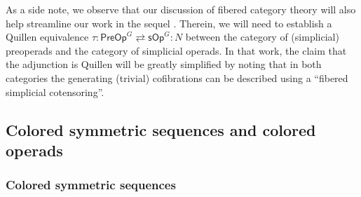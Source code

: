 \documentclass[a4paper,10pt
,draft
]{article}%
\numberwithin{equation}{section}
\numberwithin{figure}{section}
\theoremstyle{definition} %
\newcommand{\1}{\ensuremath{\mathbbm 1}}%
\begin{document}
As a side note, we observe that our discussion of fibered category theory will
also help streamline our work in the sequel \cite{BP_TAS}.
Therein, we will need to establish a Quillen equivalence
$\tau \colon \mathsf{PreOp}^G \rightleftarrows \mathsf{sOp}^G\colon N$
between the category of (simplicial) preoperads and
the category of simplicial operads.
In that work, the claim that the adjunction is Quillen 
will be greatly simplified by noting that in both categories 
the generating (trivial) cofibrations
can be described using a ``fibered simplicial cotensoring''.






\subsection{Colored symmetric sequences and colored operads}
\label{EQCOSYMSEQ SEC}


\subsubsection*{Colored symmetric sequences}
\end{document}
